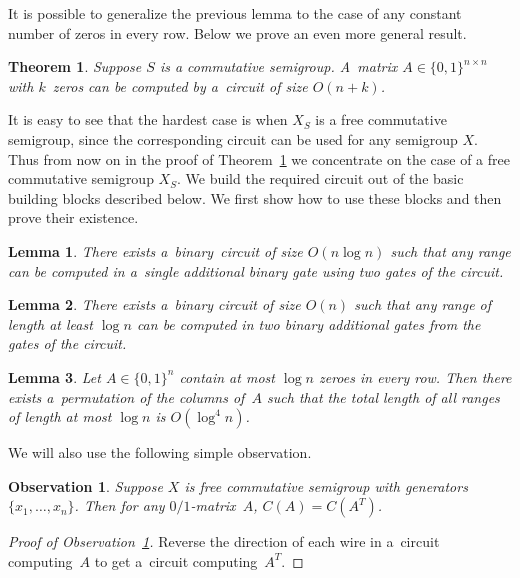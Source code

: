 \documentclass[11pt,letterpaper]{article}
\newtheorem{lemma}{Lemma}
\newtheorem{observation}{Observation}
\newtheorem{theorem}{Theorem}
\begin{document}
It is possible to generalize the previous lemma to the case of
any constant number of zeros in every row. Below we prove
an even more general result.


\begin{theorem}\label{thm:main}
Suppose $S$ is a commutative semigroup. A~matrix $A \in \{0,1\}^{n \times n}$
with $k$~zeros can be computed by a~circuit of size $O(n+k)$.
\end{theorem}

It is easy to see that the hardest case is when $X_S$ is a free commutative
semigroup, since the corresponding circuit can be used for any semigroup $X$.
Thus from now on in the proof of Theorem~\ref{thm:main} we concentrate on the
case of a free commutative semigroup $X_S$. We build the required circuit out
of the basic building blocks described below. We first show how to use these
blocks and then prove their existence.

\begin{lemma}\label{lemma:decompose}
There exists a~binary~circuit of size $O(n\log n)$ such that
any range can be computed in a~single additional binary gate
using two gates of the circuit.
\end{lemma}

\begin{lemma}\label{lemma:blocks}
There exists a~binary circuit of size $O(n)$ such that any range
of length at least $\log n$ can be computed in two binary
additional gates from the gates of the circuit.
\end{lemma}

\begin{lemma}\label{lemma:permute}
Let $A \in \{0,1\}^n$ contain at most $\log n$ zeroes in
every row. Then there exists a~permutation of the columns of~$A$
such that the total length of all ranges of length
at most $\log n$ is $O(\log^4 n)$.
\end{lemma}

We will also use the following simple observation.

\begin{observation}\label{obs:transpose}
Suppose $X$ is free commutative semigroup with generators $\{x_1,\ldots, x_n\}$.
Then for any $0/1$-matrix~$A$, $C(A)=C(A^T)$.
\end{observation}
\begin{proof}[Proof of Observation~\ref{obs:transpose}]
Reverse the direction of each wire in a~circuit computing~$A$ to get a~circuit
computing~$A^T$.
\end{proof}
\end{document}
